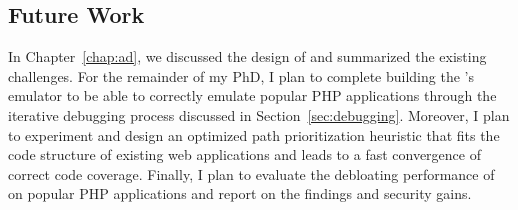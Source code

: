 \subsection*{Future Work}
\label{sec:futurework}

In Chapter~\ref{chap:ad}, we discussed the design of \animatedead{} and summarized the existing challenges. 
For the remainder of my PhD, I plan to complete building the \animatedead{}'s emulator to be able to correctly emulate popular PHP applications through the iterative debugging process discussed in Section~\ref{sec:debugging}. 
Moreover, I plan to experiment and design an optimized path prioritization heuristic that fits the code structure of existing web applications and leads to a fast convergence of correct code coverage. 
Finally, I plan to evaluate the debloating performance of \animatedead{} on popular PHP applications and report on the findings and security gains. 
